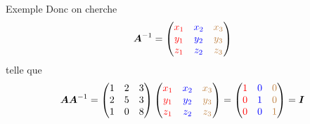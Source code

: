 \documentclass[french]{beamer}
\begin{document}
\begin{frame}{Exemple}
Donc on cherche
\[
\boldsymbol{A}^{-1} = \begin{pmatrix}
{\color{red}x_1} & {\color{blue}x_2} & {\color{brown}x_3} \\
{\color{red}y_1} & {\color{blue}y_2} & {\color{brown}y_3} \\
{\color{red}z_1} & {\color{blue}z_2} & {\color{brown}z_3}
\end{pmatrix}
\]
telle que
\[
\boldsymbol{A} \boldsymbol{A}^{-1} = \begin{pmatrix}
1 & 2 & 3 \\
2 & 5 & 3 \\
1 & 0 & 8
\end{pmatrix}\begin{pmatrix}
{\color{red}x_1} & {\color{blue}x_2} & {\color{brown}x_3} \\
{\color{red}y_1} & {\color{blue}y_2} & {\color{brown}y_3} \\
{\color{red}z_1} & {\color{blue}z_2} & {\color{brown}z_3}
\end{pmatrix}
=
\begin{pmatrix}
{\color{red}1} & {\color{blue}0} & {\color{brown}0} \\
{\color{red}0} & {\color{blue}1} & {\color{brown}0} \\
{\color{red}0} & {\color{blue}0} & {\color{brown}1}
\end{pmatrix} = \boldsymbol{I}
\]
\end{frame}
\end{document}
